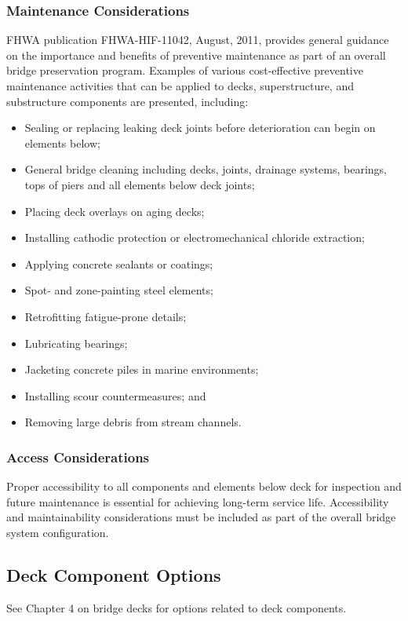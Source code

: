 \subsubsection{Maintenance Considerations}
FHWA publication FHWA-HIF-11042, August, 2011, provides general guidance on the importance and benefits
of preventive maintenance as part of an overall bridge preservation program. Examples of various cost-effective
preventive maintenance activities that can be applied to decks, superstructure, and substructure components are
presented, including:
\begin{itemize}
  \item Sealing or replacing leaking deck joints before deterioration can begin on elements below;
  \item General bridge cleaning including decks, joints, drainage systems, bearings, tops of piers and all elements
  below deck joints;
  \item  Placing deck overlays on aging decks;
  \item Installing cathodic protection or electromechanical chloride extraction;
  \item Applying concrete sealants or coatings;
  \item Spot- and zone-painting steel elements;
  \item  Retrofitting fatigue-prone details;
  \item Lubricating bearings;
  \item Jacketing concrete piles in marine environments;
  \item Installing scour countermeasures; and
  \item Removing large debris from stream channels.
\end{itemize}

\subsubsection{Access Considerations}
Proper accessibility to all components and elements below deck for inspection and future maintenance is
essential for achieving long-term service life. Accessibility and maintainability considerations must be included as
part of the overall bridge system configuration.

\subsection{Deck Component Options}
See Chapter 4 on bridge decks for options related to deck components.

